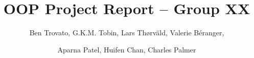\documentclass[sigconf]{acmart}
\title{OOP Project Report -- Group XX}
\author{Ben Trovato, G.K.M. Tobin, Lars Th{\o}rv{\"a}ld, Valerie B\'eranger,}
\author{Aparna Patel, Huifen Chan, Charles Palmer}
\begin{document}
\begin{abstract}

\end{abstract}

\maketitle






\end{document}
